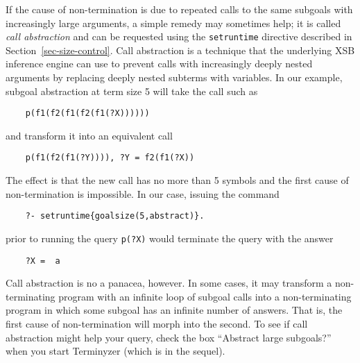 If the cause of non-termination is due to repeated calls to the same
subgoals with increasingly large arguments, a simple remedy may sometimes
help; it is called \emph{call abstraction}   and can be requested using the
\texttt{setruntime} directive described in Section~\ref{sec-size-control}. 
Call abstraction is a technique that the underlying XSB inference engine
can use to prevent calls with increasingly deeply nested arguments by
replacing deeply nested subterms with variables. In our example, subgoal
abstraction at term size 5 will take the call
such as
\begin{verbatim}
    p(f1(f2(f1(f2(f1(?X))))))
\end{verbatim}
and transform it into an equivalent call
\begin{verbatim}
    p(f1(f2(f1(?Y)))), ?Y = f2(f1(?X))
\end{verbatim}
The effect is that the new call has no more than 5 symbols and the first
cause of non-termination is impossible. In our case, issuing the command
\begin{verbatim}
    ?- setruntime{goalsize(5,abstract)}.
\end{verbatim}
prior to running the query \texttt{p(?X)} would terminate the query with
the answer 
\begin{verbatim}
    ?X =  a
\end{verbatim}
Call abstraction is no a panacea, however. In some cases, it may transform a
non-terminating program with an infinite loop of subgoal calls into a
non-terminating program in which some subgoal has an infinite number of
answers. That is, the first cause of non-termination will morph into the
second. To see if call abstraction might help your query, check the box
``Abstract large subgoals?'' when you start Terminyzer (which is in the
sequel).

